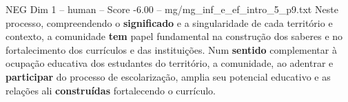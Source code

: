 \begin{textsample}{NEG Dim 1 – human – Score -6.00 – mg/mg\_inf\_e\_ef\_intro\_5\_p9.txt}  \label{ex:f1_neg_012}
Neste processo, compreendendo o \textbf{significado} e a singularidade de cada território e contexto, a comunidade \textbf{tem} papel fundamental na construção dos saberes e no fortalecimento dos currículos e das instituições.
Num \textbf{sentido} complementar à ocupação educativa dos estudantes do território, a comunidade, ao adentrar e \textbf{participar} do processo de escolarização, amplia seu potencial educativo e as relações ali \textbf{construídas} fortalecendo o currículo.

\end{textsample}
